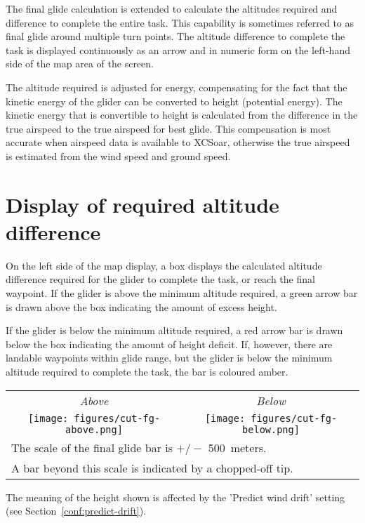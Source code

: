 The final glide calculation is extended to calculate the altitudes
required and difference to complete the entire task.  This capability
is sometimes referred to as final glide around multiple turn points.
The altitude difference to complete the task is displayed continuously
as an arrow and in numeric form on the left-hand side of the map area
of the screen.

The altitude required is adjusted for energy, compensating for
the fact that the kinetic energy of the glider can be converted to
height (potential energy).  The kinetic energy that is convertible to
height is calculated from the difference in the true airspeed to the
true airspeed for best glide.  This compensation is most accurate when
airspeed data is available to XCSoar, otherwise the true airspeed is
estimated from the wind speed and ground speed.


\section{Display of required altitude difference}

On the left side of the map display, a box displays the calculated
altitude difference required for the glider to complete the task, or
reach the final waypoint.  If the glider is above the minimum altitude
required, a green arrow bar is drawn above the box indicating the
amount of excess height.

If the glider is below the minimum altitude required, a red arrow bar is
drawn below the box indicating the amount of height deficit.  If,
however, there are landable waypoints within glide range, but the
glider is below the minimum altitude required to complete the task, the
bar is coloured amber.

\begin{center}
\begin{tabular}{c c}
\emph{Above} & \emph{Below} \\
\texttt{[image: figures/cut-fg-above.png]} &
\texttt{[image: figures/cut-fg-below.png]} \\
\multicolumn{2}{l}{The scale of the final glide bar is $+/-$ 500~meters.} \\
\multicolumn{2}{l}{A bar beyond this scale is indicated by a chopped-off tip.}
\end{tabular}
\end{center}
The meaning of the height shown is affected by
the 'Predict wind drift' setting (see Section~\ref{conf:predict-drift}).



